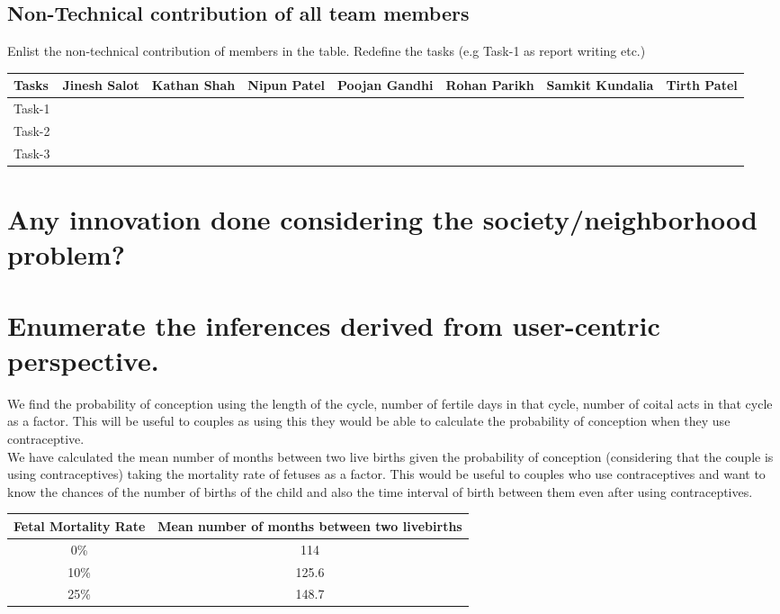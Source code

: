 \documentclass{article}
\begin{document}
\subsection{Non-Technical contribution of all team members }
Enlist the non-technical contribution of members in the table. Redefine the tasks (e.g Task-1 as report writing etc.)
\begin{table}[h]
\begin{tabular}{|l|l|l|l|l|l|l|l}
	\hline
	Tasks  & Jinesh Salot & Kathan Shah & Nipun Patel & Poojan Gandhi & Rohan Parikh & Samkit Kundalia & Tirth Patel \\ \hline
	Task-1 &      &       &        &          &     &       &         \\ \hline
	Task-2 &      &       &        &          &     &       &         \\ \hline
	Task-3 &      &       &        &          &     &       &       \\ \hline
\end{tabular}
\end{table}

\section{Any innovation done considering the society/neighborhood problem?}

\section{Enumerate the inferences derived from user-centric perspective.}
We find the probability of conception using the length of the cycle, number of fertile days in that cycle, number of coital acts in that cycle as a factor. This will be useful to couples as using this they would be able to calculate the probability of conception when they use contraceptive.\\

We have calculated the mean number of months between two live births given the probability of conception (considering that the couple is using contraceptives) taking the mortality rate of fetuses as a factor. This would be useful to couples who use contraceptives and want to know the chances of the number of births of the child and also the time interval of birth between them even after using contraceptives.\\
\begin{table}[h]
\begin{tabular}{|c|c|}
	\hline
	Fetal Mortality Rate  & Mean number of months between two livebirths\\ \hline
	0\% & 114     \\ \hline
	10\% & 125.6 \\ \hline
	25\% & 148.7 \\ \hline
\end{tabular}
\end{table}
\end{document}
